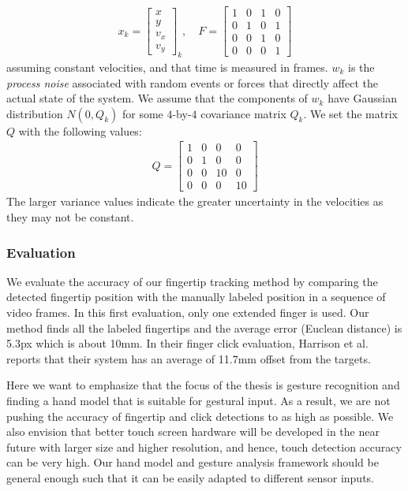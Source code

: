 \begin{align*}
x_k = \begin{bmatrix}
	x   \\
	y   \\
	v_x \\
	v_y \end{bmatrix}_k, \quad
F = \begin{bmatrix}
	1 & 0 & 1 & 0 \\
	0 & 1 & 0 & 1 \\
	0 & 0 & 1 & 0 \\
	0 & 0 & 0 & 1 \end{bmatrix}
\end{align*}
assuming constant velocities, and that time is measured in frames.
$w_k$ is the \textit{process noise} associated with random events or forces
that directly affect the actual state of the system. We assume that the 
components of $w_k$ have Gaussian distribution $N(0, Q_k)$ for some $4$-by-$4$ 
covariance matrix $Q_k$. We set the matrix $Q$ with the following values:
\begin{align*}
Q = \begin{bmatrix}
	1 & 0 & 0 & 0 \\
	0 & 1 & 0 & 0 \\
	0 & 0 & 10 & 0 \\
	0 & 0 & 0 & 10 
	\end{bmatrix}
\end{align*}
The larger variance values indicate the greater uncertainty in the velocities as
they may not be constant.

\subsubsection{Evaluation}
We evaluate the accuracy of our fingertip tracking method by comparing the
detected fingertip position with the manually labeled position in a sequence of
video frames. In this first evaluation, only one extended finger is used. Our
method finds all the labeled fingertips and the average error (Euclean distance)
is 5.3px which is about 10mm. In their finger click evaluation, Harrison et al.
reports that their system has an average of 11.7mm offset from the targets. 

Here we want to emphasize that the focus of the thesis is gesture recognition
and finding a hand model that is suitable for gestural input. As a result, we
are not pushing the accuracy of fingertip and click detections to as high as
possible. We also envision that better touch screen hardware will be developed
in the near future with larger size and higher resolution, and hence, touch
detection accuracy can be very high. Our hand model and gesture analysis
framework should be general enough such that it can be easily adapted to
different sensor inputs.

